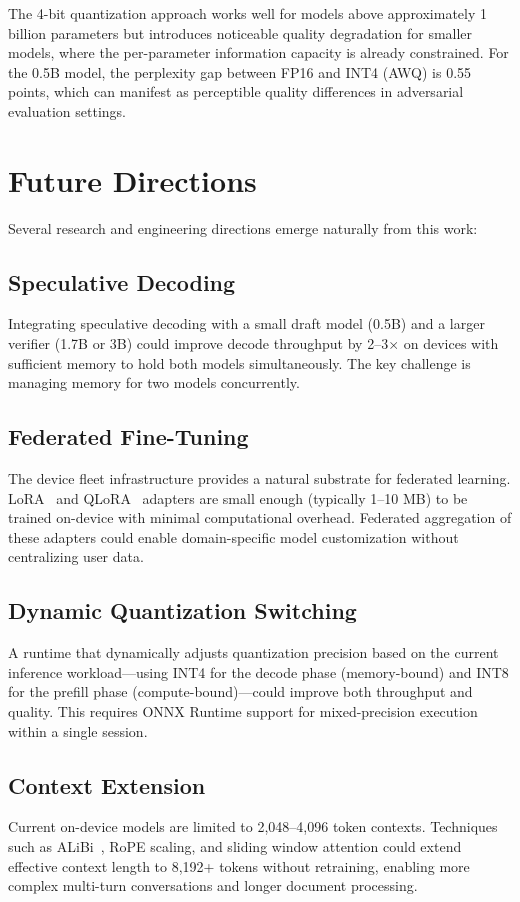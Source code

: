 \documentclass[12pt, letterpaper, twoside]{report}
\begin{document}
The 4-bit quantization approach works well for models above approximately 1 billion parameters but introduces noticeable quality degradation for smaller models, where the per-parameter information capacity is already constrained. For the 0.5B model, the perplexity gap between FP16 and INT4 (AWQ) is 0.55 points, which can manifest as perceptible quality differences in adversarial evaluation settings.

\section{Future Directions}
\label{sec:future}

Several research and engineering directions emerge naturally from this work:

\subsection{Speculative Decoding}
Integrating speculative decoding with a small draft model (0.5B) and a larger verifier (1.7B or 3B) could improve decode throughput by 2--3$\times$ on devices with sufficient memory to hold both models simultaneously. The key challenge is managing memory for two models concurrently.

\subsection{Federated Fine-Tuning}
The device fleet infrastructure provides a natural substrate for federated learning. LoRA~\cite{hu2021lora} and QLoRA~\cite{dettmers2024qlora} adapters are small enough (typically 1--10 MB) to be trained on-device with minimal computational overhead. Federated aggregation of these adapters could enable domain-specific model customization without centralizing user data.

\subsection{Dynamic Quantization Switching}
A runtime that dynamically adjusts quantization precision based on the current inference workload---using INT4 for the decode phase (memory-bound) and INT8 for the prefill phase (compute-bound)---could improve both throughput and quality. This requires ONNX Runtime support for mixed-precision execution within a single session.

\subsection{Context Extension}
Current on-device models are limited to 2,048--4,096 token contexts. Techniques such as ALiBi~\cite{press2021alibi}, RoPE scaling, and sliding window attention could extend effective context length to 8,192+ tokens without retraining, enabling more complex multi-turn conversations and longer document processing.
\end{document}
